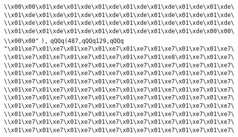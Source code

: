 \verb|\\x00\x00\x01\xde\x01\xde\x01\xde\x01\xde\x01\xde\x01\xde\x01\xde\|\newline
\verb|\\x01\xde\x01\xde\x01\xde\x01\xde\x01\xde\x01\xde\x01\xde\x01\xde\|\newline
\verb|\\x01\xde\x01\xde\x01\xde\x01\xde\x01\xde\x01\xde\x01\xde\x01\xde\|\newline
\verb|\\x01\xde\x01\xde\x01\xde\x01\xde\x01\xde\x01\xde\x01\xde\x00\x00\|\newline
\verb|\\x00\x00"|\newline
\verb|),|\newline
\verb|qQQq(487,qQQq129,qQQq|\newline
\verb|"\x01\xe7\x01\xe7\x01\xe7\x01\xe7\x01\xe7\x01\xe7\x01\xe7\x01\xe7\|\newline
\verb|\\x01\xe7\x01\xe7\x01\xe7\x01\xe7\x01\xe7\x01\xe8\x01\xe7\x01\xe7\|\newline
\verb|\\x01\xe7\x01\xe7\x01\xe7\x01\xe7\x01\xe7\x01\xe7\x01\xe7\x01\xe7\|\newline
\verb|\\x01\xe7\x01\xe7\x01\xe7\x01\xe7\x01\xe7\x01\xe7\x01\xe7\x01\xe7\|\newline
\verb|\\x01\xe7\x01\xe7\x01\xe7\x01\xe7\x01\xe7\x01\xe7\x01\xe7\x01\xe7\|\newline
\verb|\\x01\xe7\x01\xe7\x01\xe7\x01\xe7\x01\xe7\x01\xe7\x01\xe7\x01\xe7\|\newline
\verb|\\x01\xe7\x01\xe7\x01\xe7\x01\xe7\x01\xe7\x01\xe7\x01\xe7\x01\xe7\|\newline
\verb|\\x01\xe7\x01\xe7\x01\xe7\x01\xe7\x01\xe7\x01\xe7\x01\xe7\x01\xe7\|\newline
\verb|\\x01\xe7\x01\xe7\x01\xe7\x01\xe7\x01\xe7\x01\xe7\x01\xe7\x01\xe7\|\newline
\verb|\\x01\xe7\x01\xe7\x01\xe7\x01\xe7\x01\xe7\x01\xe7\x01\xe7\x01\xe7\|\newline
\verb|\\x01\xe7\x01\xe7\x01\xe7\x01\xe7\x01\xe7\x01\xe7\x01\xe7\x01\xe7\|\newline

